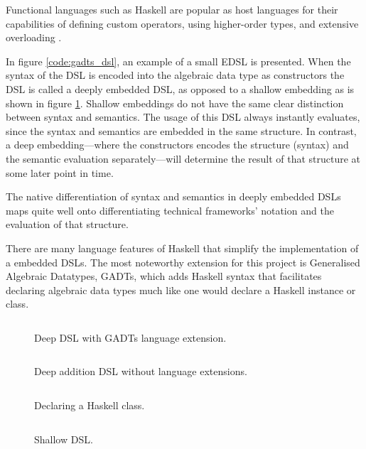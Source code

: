 Functional languages such as Haskell are popular as host languages for their capabilities of defining custom operators, using higher-order types, and extensive overloading \cite{techniquesforedsls}.

In figure \ref{code:gadts_dsl}, an example of a small EDSL is presented. When the syntax of the DSL is encoded into the algebraic data type as constructors the DSL is called a deeply embedded DSL, as opposed to a shallow embedding as is shown in figure \ref{code:shallow}. Shallow embeddings do not have the same clear distinction between syntax and semantics. The usage of this DSL always instantly evaluates, since the syntax and semantics are embedded in the same structure. In contrast, a deep embedding---where the constructors encodes the structure (syntax) and the semantic evaluation separately---will determine the result of that structure at some later point in time.

The native differentiation of syntax and semantics in deeply embedded DSLs maps quite well onto differentiating technical frameworks' notation and the evaluation of that structure. 

There are many language features of Haskell that simplify the implementation of a embedded DSLs. %
The most noteworthy extension for this project is Generalised Algebraic Datatypes, GADTs, which adds Haskell syntax that facilitates declaring algebraic data types much like one would declare a Haskell instance or class.

\begin{figure}[ht]
    \begin{minipage}{.499\linewidth}
        \centering
        \inputminted[autogobble]{haskell}{code/data.hs}
        \caption{Deep DSL with GADTs language extension.} 
        \label{code:gadts_dsl}
    \end{minipage}
    \begin{minipage}{.499\linewidth}
        \inputminted[autogobble]{haskell}{code/data_no_GATDs.hs}
        \caption{Deep addition DSL without language extensions.} 
        \label{code:vanilla_dsl}                    
    \end{minipage}\par\medskip %
    \begin{minipage}{.499\linewidth}
        \inputminted{haskell}{code/class.hs}  
        \caption{Declaring a Haskell class.} 
        \label{code:class}
    \end{minipage}
    \begin{minipage}{.499\linewidth}
        \inputminted[autogobble]{haskell}{code/shallow_dsl.hs}  
        \caption{Shallow DSL.} 
        \label{code:shallow}
    \end{minipage}
\end{figure}

